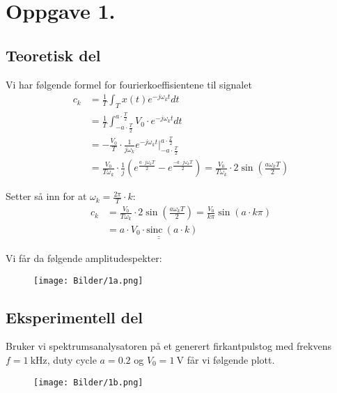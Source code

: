 \documentclass[a4paper,11pt,norsk]{article}
\begin{document}


\section*{Oppgave 1.}
\subsection*{Teoretisk del}
Vi har følgende formel for fourierkoeffisientene til signalet
\begin{align*}
    c_k &= \frac{1}{T} \int_{T}{x(t)e^{-j\omega_k t} dt} \\
        &= \frac{1}{T} \int_{-a \cdot \frac{T}{2}}^{a \cdot \frac{T}{2}}{V_0 \cdot e^{-j\omega_k t} dt} \\
        &= - \frac{V_0}{T} \cdot \frac{1}{j\omega_k} e^{-j\omega_k t} \bigg\rvert_{-a \cdot \frac{T}{2}}^{a \cdot \frac{T}{2}} \\
        &= \frac{V_0}{T \omega_k} \cdot \frac{1}{j}\left(e^{\frac{a \cdot j\omega_k T}{2}} - e^{\frac{-a \cdot j\omega_k T}{2}}\right) = \frac{V_0}{T \omega_k} \cdot 2\sin{\left(\frac{a \omega_k T}{2}\right)}
\end{align*}

Setter så inn for at $\omega_k = \frac{2\pi}{T} \cdot k$:
\begin{align*}
    c_k &= \frac{V_0}{T \omega_k} \cdot 2\sin{\left(\frac{a \omega_k T}{2}\right)} = \frac{V_0}{k \pi} \sin{\left(a \cdot k \pi\right)} \\
        &= \underline{\underline{a \cdot V_0 \cdot \text{sinc}\:{\left(a \cdot k\right)}}}
\end{align*}

Vi får da følgende amplitudespekter:
\begin{figure}[H]
    \centering
    \texttt{[image: Bilder/1a.png]} 
\end{figure}

\subsection*{Eksperimentell del}
Bruker vi spektrumsanalysatoren på et generert firkantpulstog med frekvens $f = \SI{1}{\kilo\hertz}$, duty cycle $a = 0.2$ og 
$V_0 = \SI{1}{\volt}$ får vi følgende plott.

\begin{figure}[H]
    \centering
    \texttt{[image: Bilder/1b.png]} 
\end{figure}
\end{document}
